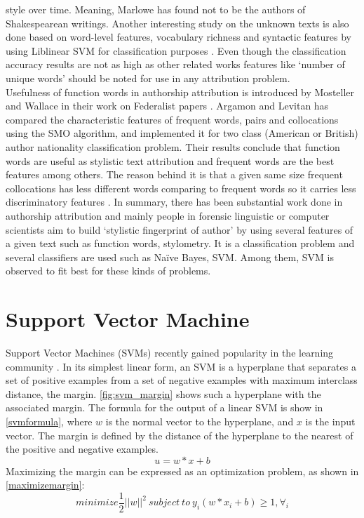 style over time. Meaning, Marlowe has found not to be the authors of Shakespearean
writings.
Another interesting study on the unknown texts is also
done based on word-level features, vocabulary richness and syntactic features by using
Liblinear SVM for classification purposes \cite{stanko2013whose}. Even though the classification accuracy
results are not as high as other related works features like \enquote*{number of unique words}
should be noted for use in any attribution problem.\\
Usefulness of function words in authorship attribution is introduced by Mosteller
and Wallace in their work on Federalist papers \cite{mosteller2007inference}. Argamon and Levitan has compared the characteristic features of frequent words, pairs and collocations using the
SMO algorithm, and implemented it for two class (American or British) author nationality classification problem. Their results conclude that function words are useful
as stylistic text attribution and frequent words are the best features among others.
The reason behind it is that a given same size frequent collocations has less different
words comparing to frequent words so it carries less discriminatory features \cite{argamon2005measuring}.
In summary, there has been substantial work done in authorship attribution and
mainly people in forensic linguistic or computer scientists aim to build \enquote*{stylistic fingerprint of author} by using several features of a given text such as function words,
stylometry. It is a classification problem and several classifiers are used such as Na\"ive
Bayes, SVM. Among them, SVM is observed to fit best for these kinds of problems.

\section{Support Vector Machine}
Support Vector Machines (SVMs) recently gained popularity in the learning community \cite{vapnik1999overview}. In its simplest
linear form, an SVM is a hyperplane that separates
a set of positive examples from a set of negative examples with maximum interclass distance, the margin.
\autoref{fig:svm_margin} shows such a hyperplane with the associated
margin.
The formula for the output of a linear SVM is show in \autoref{svmformula}, where $w$ is the normal vector to the hyperplane, and $x$ is the input vector. The margin is defined by the distance of the hyperplane to the nearest of the positive
and negative examples.
\begin{equation}\label{svmformula}
	u = w * x + b
\end{equation}
Maximizing the margin can be
expressed as an optimization problem, as shown in  \autoref{maximizemargin}:
\begin{equation}\label{maximizemargin}
	minimize\frac{1}{2}||w||^2\ subject\ to\ y_i(w*x_i+b)\geq 1, \forall_i
\end{equation}

